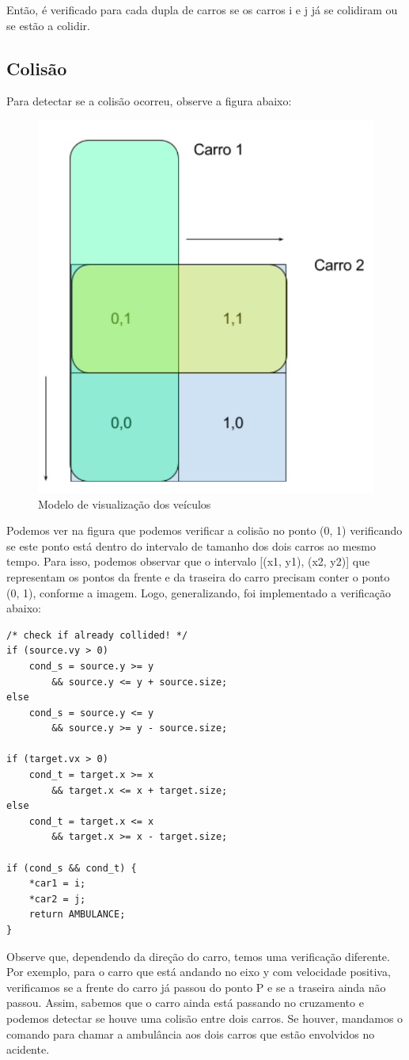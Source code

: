 \documentclass[10pt,twocolumn,letterpaper]{article}
\begin{document}
    Então,  é verificado para cada dupla de carros se os carros i e j já se colidiram ou se estão a colidir.

\subsection{Colisão}
    Para detectar se a colisão ocorreu, observe a figura abaixo:

\begin{figure}[ht!]
    \center\includegraphics[width=.5\hsize]{img/car-vis}
    \caption{Modelo de visualização dos veículos}
\end{figure}

    Podemos ver na figura que podemos verificar a colisão no ponto (0, 1) verificando se este ponto está dentro do intervalo de tamanho dos dois carros ao mesmo tempo. Para isso, podemos observar que o intervalo [(x1, y1), (x2, y2)] que representam os pontos da frente e da traseira do carro precisam conter o ponto (0, 1), conforme a imagem. Logo, generalizando, foi implementado a verificação abaixo:

\begin{lstlisting}[caption={Algoritmo de detecção de colisão (1)}, label=Algorithm]
/* check if already collided! */
if (source.vy > 0)
    cond_s = source.y >= y 
        && source.y <= y + source.size;
else
    cond_s = source.y <= y 
        && source.y >= y - source.size;

if (target.vx > 0)
    cond_t = target.x >= x 
        && target.x <= x + target.size;
else
    cond_t = target.x <= x 
        && target.x >= x - target.size;

if (cond_s && cond_t) {
    *car1 = i;
    *car2 = j;
    return AMBULANCE;
}
\end{lstlisting}

    Observe que, dependendo da direção do carro, temos uma verificação diferente. Por exemplo, para o carro que está andando no eixo y com velocidade positiva, verificamos se a frente do carro já passou do ponto P e se a traseira ainda não passou. Assim, sabemos que o carro ainda está passando no cruzamento e podemos detectar se houve uma colisão entre dois carros. Se houver, mandamos o comando para chamar a ambulância aos dois carros que estão envolvidos no acidente.
    
\end{document}
